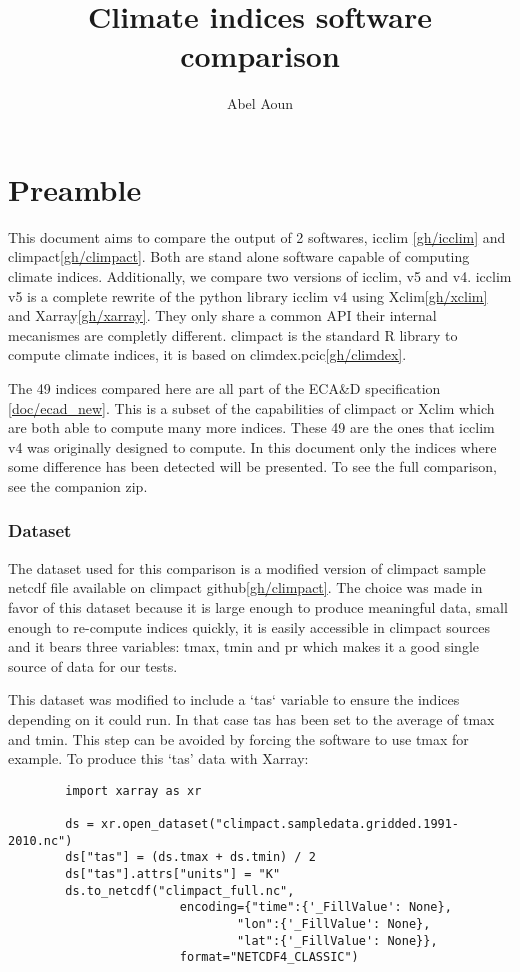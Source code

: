 \documentclass[a4paper,11pt]{article}
\title{Climate indices software comparison}
\author{Abel Aoun}
\begin{document}
\maketitle
\part*{Preamble}
    This document aims to compare the output of 2 softwares, icclim \ref{gh/icclim} and climpact\ref{gh/climpact}. Both are stand alone software capable of computing climate indices.
    Additionally, we compare two versions of icclim, v5 and v4.
    icclim v5 is a complete rewrite of the python library icclim v4 using Xclim\ref{gh/xclim} and Xarray\ref{gh/xarray}. They only share a common API their internal mecanismes are completly different.
    climpact is the standard R library to compute climate indices, it is based on climdex.pcic\ref{gh/climdex}.

    The 49 indices compared here are all part of the ECA\&D specification
    \ref{doc/ecad_new}.
    This is a subset of the capabilities of climpact or Xclim which are both able to compute many 
    more indices.
    These 49 are the ones that icclim v4 was originally designed to compute.
    In this document only the indices where some difference has been detected will be presented.
    To see the full comparison, see the companion zip.
\section{Dataset}
    The dataset used for this comparison is a modified version of climpact sample netcdf file available on climpact github\ref{gh/climpact}.
    The choice was made in favor of this dataset because it is large enough to produce meaningful data,
    small enough to re-compute indices quickly, it is easily accessible in climpact sources and it bears three variables: tmax, tmin and pr which 
    makes it a good single source of data for our tests.

    This dataset was modified to include a `tas` variable to ensure the indices depending on it could
    run. In that case tas has been set to the average of tmax and tmin.
    This step can be avoided by forcing the software to use tmax for example.
    To produce this `tas' data with Xarray:
    \begin{lstlisting}
        import xarray as xr

        ds = xr.open_dataset("climpact.sampledata.gridded.1991-2010.nc")
        ds["tas"] = (ds.tmax + ds.tmin) / 2
        ds["tas"].attrs["units"] = "K"
        ds.to_netcdf("climpact_full.nc",
                        encoding={"time":{'_FillValue': None},
                                "lon":{'_FillValue': None},
                                "lat":{'_FillValue': None}},
                        format="NETCDF4_CLASSIC")
    \end{lstlisting}
\end{document}
